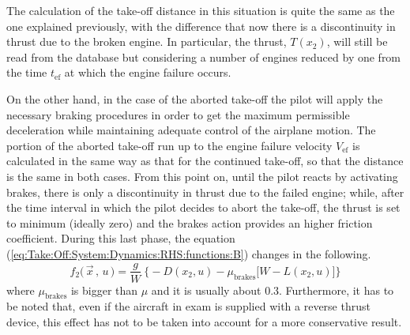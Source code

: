 \bigskip
\noindent
The calculation of the take-off distance in this situation is quite the same as the one explained previously, with the difference that now there is a discontinuity in thrust due to the broken engine. In particular, the thrust, $T(x_2)$, will still be read from the database but considering a number of engines reduced by one from the time $t_{\text{ef}}$ at which the engine failure occurs.

\bigskip
\noindent
On the other hand, in the case of the aborted take-off the pilot will apply the necessary braking procedures in order to get the maximum permissible deceleration while maintaining adequate control of the airplane motion. The portion of the aborted take-off run up to the engine failure velocity $V_{\text{ef}}$ is calculated in the same way as that for the continued take-off, so that the distance is the same in both cases. 
%
From this point on, until the pilot reacts by activating brakes, there is only a discontinuity in thrust due to the failed engine; while, after the time interval in which the pilot decides to abort the take-off, the thrust is set to minimum (ideally zero) and the brakes action provides an higher friction coefficient. During this last phase, the equation (\ref{eq:Take:Off:System:Dynamics:RHS:functions:B}) changes in the following.
%
\begin{equation}\label{eq:Take:Off:System:Dynamics:RHS:functions:Aborted}
f_2 \big(\, \vec{x}\,,\,u \,\big) =\frac{g}{W}\ \big\{ - D(x_2,u) - \mu_{\text{brakes}} \big[ W - L(x_2,u) \big]\big\} 
\end{equation}
%
where $\mu_{\text{brakes}}$ is bigger than $\mu$ and it is usually about 0.3.
%
Furthermore, it has to be noted that, even if the aircraft in exam is supplied with a reverse thrust device, this effect has not to be taken into account for a more conservative result. 

